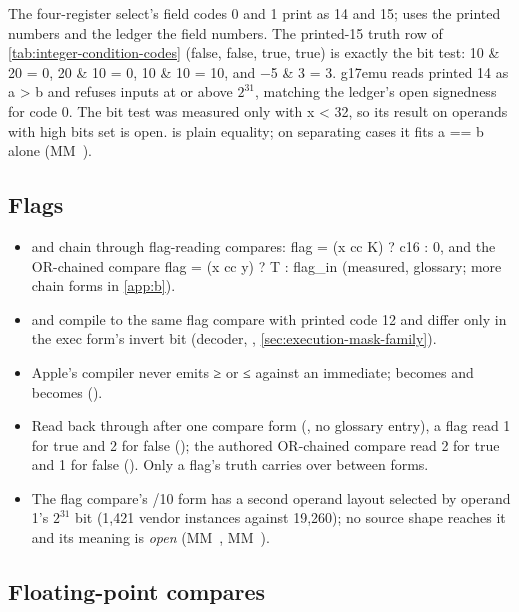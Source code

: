 The four-register select's field codes 0 and 1 print as 14 and 15;  uses
the printed numbers and the ledger the field numbers. The printed-15 truth row of \cref{tab:integer-condition-codes} (false, false, true,
true) is exactly the bit test: 10 \& 20 = 0, 20 \& 10 = 0, 10 \& 10 = 10, and −5 \& 3 = 3. g17emu reads printed 14 as a > b
and refuses inputs at or above $2^{31}$, matching the ledger's open signedness for code 0. The bit test was measured only with x < 32, so its result on
operands with high bits set is open.  is plain
equality; on separating cases it fits a == b alone (MM~).

\subsection*{Flags}\label{sub:flags-chains-immediates}

\begin{itemize}
\item \code{\&\&} and \code{||} chain through flag-reading compares: 
  flag = (x cc K) ? c16 : 0, and the OR-chained compare flag = (x cc y) ? T : flag\_in (measured, glossary; more chain forms in \cref{app:b}).
\item {} and  compile to the same flag compare with printed code 12 and differ only in the exec form's
  invert bit (decoder, , \cref{sec:execution-mask-family}).
\item Apple's compiler never emits ≥ or ≤ against an immediate;  becomes  and  becomes 
  ().
\item Read back through  after one compare form (, no glossary entry), a flag read 1 for true and
  2 for false (); the authored OR-chained compare read 2 for true and 1 for false
  (). Only a flag's truth carries over between forms.
\item The flag compare's /10 form has a second operand layout selected by operand 1's $2^{31}$ bit (1,421 vendor instances against 19,260); no
  source shape reaches it and its meaning is \emph{open} (MM~, MM~).
\end{itemize}

\subsection*{Floating-point compares}\label{sub:floating-point-compares}

